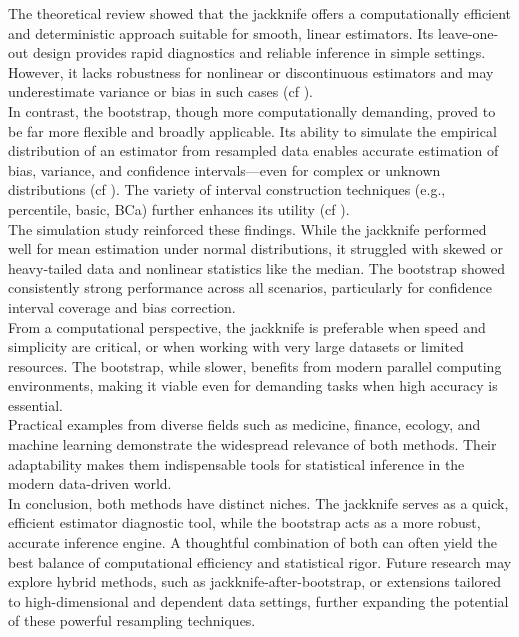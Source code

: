 \documentclass[aodsor,preprint]{imsart}
\numberwithin{equation}{section}
\theoremstyle{plain}
\begin{document}
The theoretical review showed that the jackknife offers a computationally efficient and deterministic approach suitable for smooth, linear estimators. Its leave-one-out design provides rapid diagnostics and reliable inference in simple settings. However, it lacks robustness for nonlinear or discontinuous estimators and may underestimate variance or bias in such cases (cf \cite{tukey1958bias,shao1995jackknife,davison1997bootstrap}). \\

In contrast, the bootstrap, though more computationally demanding, proved to be far more flexible and broadly applicable. Its ability to simulate the empirical distribution of an estimator from resampled data enables accurate estimation of bias, variance, and confidence intervals—even for complex or unknown distributions (cf \cite{efron1979,efron1993introduction,davison1997bootstrap}). The variety of interval construction techniques (e.g., percentile, basic, BCa) further enhances its utility (cf \cite{efron1993introduction,davison1997bootstrap}). \\

The simulation study reinforced these findings. While the jackknife performed well for mean estimation under normal distributions, it struggled with skewed or heavy-tailed data and nonlinear statistics like the median. The bootstrap showed consistently strong performance across all scenarios, particularly for confidence interval coverage and bias correction.\\

From a computational perspective, the jackknife is preferable when speed and simplicity are critical, or when working with very large datasets or limited resources. The bootstrap, while slower, benefits from modern parallel computing environments, making it viable even for demanding tasks when high accuracy is essential.\\

Practical examples from diverse fields such as medicine, finance, ecology, and machine learning demonstrate the widespread relevance of both methods. Their adaptability makes them indispensable tools for statistical inference in the modern data-driven world.\\

In conclusion, both methods have distinct niches. The jackknife serves as a quick, efficient estimator diagnostic tool, while the bootstrap acts as a more robust, accurate inference engine. A thoughtful combination of both can often yield the best balance of computational efficiency and statistical rigor. Future research may explore hybrid methods, such as jackknife-after-bootstrap, or extensions tailored to high-dimensional and dependent data settings, further expanding the potential of these powerful resampling techniques.\\
\end{document}
